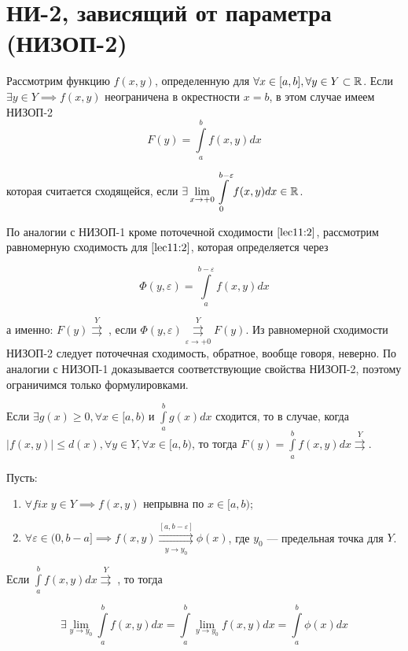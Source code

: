 \documentclass[../../main.tex]{subfiles}
\begin{document}
\section{НИ-2, зависящий от параметра (НИЗОП-2)}

	Рассмотрим функцию $f(x, y)$, определенную для $\forall x \in [a, b], \forall y \in Y \subset \mathbb{R}$. Если $\exists y \in Y \implies f(x, y)$ неограничена в окрестности $x = b$, в этом случае имеем НИЗОП-2 
	\begin{equation}\label{lec11:2}
		F(y) = \int\limits_a^b f(x, y) dx
	\end{equation}
	
	которая считается сходящейся, если $\displaystyle \exists \lim_{x \rightarrow +0} \int\limits_0^{b - \varepsilon} f(x, y) dx \in \mathbb{R}$.
	
	По аналогии с НИЗОП-1 кроме поточечной сходимости $\eqref{lec11:2}$, рассмотрим равномерную сходимость для $\eqref{lec11:2}$, которая определяется через 
	
	\begin{equation}\label{lec11:3}
		\Phi(y, \varepsilon) = \int\limits_a^{b - \varepsilon} f(x, y) dx
	\end{equation}
	
	а именно: $F(y) \overset{Y}\rightrightarrows\;$, если $\Phi(y, \varepsilon) \overset{Y}{\underset{\varepsilon \rightarrow +0}\rightrightarrows} F(y)$. Из равномерной сходимости НИЗОП-2 следует поточечная сходимость, обратное, вообще говоря, неверно. По аналогии с НИЗОП-1 доказывается соответствующие свойства НИЗОП-2, поэтому ограничимся только формулировками.
	
	\begin{thm}
		Если $\exists g(x) \geq 0, \forall x \in [a, b)$ и $\int\limits_a^b g(x) dx$ сходится, то в случае, когда $|f(x, y)| \leq d(x), \forall y \in Y, \forall x \in [a, b)$, то тогда $F(y) = \int\limits_a^b f(x, y) dx \overset{Y}{\rightrightarrows}$.
	\end{thm}
	
	\begin{thm}
		Пусть:
		
		\begin{enumerate}
			\item $\forall fix \; y \in Y \implies f(x, y)$ непрывна по $x \in [a, b)$;
			\item $\forall \varepsilon \in (0, b - a] \implies f(x, y) \overset{[a, b - \varepsilon]}{\underset{y \rightarrow y_0}\rightrightarrows} \phi(x)$, где $y_0$ --- предельная точка для $Y$.
		\end{enumerate}
		
		Если $\int\limits_a^b f(x, y) dx \overset{Y}\rightrightarrows \;$, то тогда 
		
		\begin{equation}\label{lec11:4}
			\exists \lim_{y \rightarrow y_0} \int\limits_a^b f(x, y) dx = \int\limits_a^b \lim_{y \rightarrow y_0} f(x, y) dx = \int\limits_a^b \phi(x) dx
		\end{equation}
	\end{thm}
\end{document}
